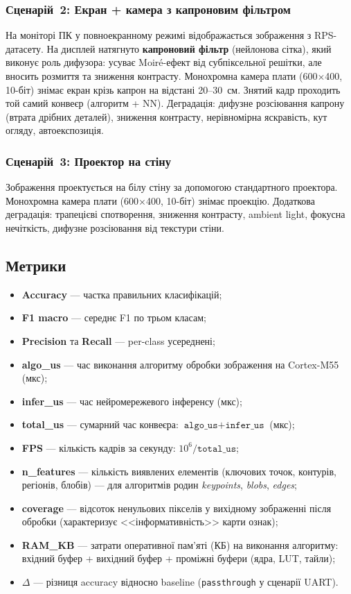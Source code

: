 \documentclass[a4paper,12pt]{article}
\begin{document}
\subsubsection{Сценарій~2: Екран + камера з капроновим фільтром}
На моніторі ПК у повноекранному режимі відображається зображення з RPS-датасету. На дисплей натягнуто \textbf{капроновий фільтр} (нейлонова сітка), який виконує роль дифузора: усуває Moiré-ефект від субпіксельної решітки, але вносить розмиття та зниження контрасту. Монохромна камера плати (600$\times$400, 10-біт) знімає екран крізь капрон на відстані 20--30~см. Знятий кадр проходить той самий конвеєр (алгоритм + NN). Деградація: дифузне розсіювання капрону (втрата дрібних деталей), зниження контрасту, нерівномірна яскравість, кут огляду, автоекспозиція.

\subsubsection{Сценарій~3: Проектор на стіну}
Зображення проектується на білу стіну за допомогою стандартного проектора. Монохромна камера плати (600$\times$400, 10-біт) знімає проекцію. Додаткова деградація: трапецієві спотворення, зниження контрасту, ambient light, фокусна нечіткість, дифузне розсіювання від текстури стіни.

\subsection{Метрики}
\begin{itemize}
	\item \textbf{Accuracy} --- частка правильних класифікацій;
	\item \textbf{F1 macro} --- середнє F1 по трьом класам;
	\item \textbf{Precision} та \textbf{Recall} --- per-class усереднені;
	\item \textbf{algo\_us} --- час виконання алгоритму обробки зображення на Cortex-M55 (мкс);
	\item \textbf{infer\_us} --- час нейромережевого інференсу (мкс);
	\item \textbf{total\_us} --- сумарний час конвеєра: $\texttt{algo\_us} + \texttt{infer\_us}$ (мкс);
	\item \textbf{FPS} --- кількість кадрів за секунду: $10^6 / \texttt{total\_us}$;
	\item \textbf{n\_features} --- кількість виявлених елементів (ключових точок, контурів, регіонів, блобів) --- для алгоритмів родин \emph{keypoints}, \emph{blobs}, \emph{edges};
	\item \textbf{coverage} --- відсоток ненульових пікселів у вихідному зображенні після обробки (характеризує <<інформативність>> карти ознак);
	\item \textbf{RAM\_KB} --- затрати оперативної пам'яті (КБ) на виконання алгоритму: вхідний буфер + вихідний буфер + проміжні буфери (ядра, LUT, тайли);
	\item $\Delta$ --- різниця accuracy відносно baseline (\texttt{passthrough} у сценарії UART).
\end{itemize}
\end{document}
